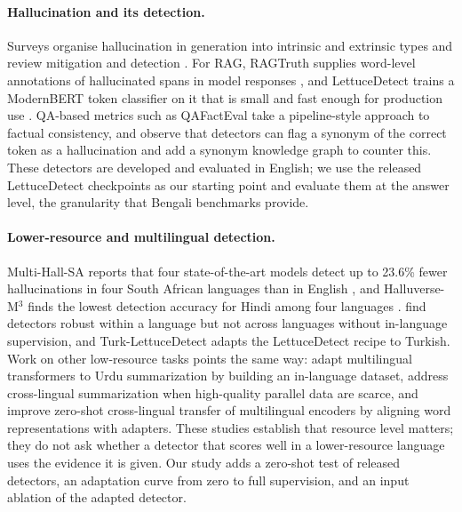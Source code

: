 \documentclass[manuscript,screen,review]{acmart}
\begin{document}
\paragraph{Hallucination and its detection.}
Surveys organise hallucination in generation into intrinsic and extrinsic types and review mitigation and detection \cite{ji2023survey,huang2025survey,maynez2020faithfulness}. For RAG, RAGTruth supplies word-level annotations of hallucinated spans in model responses \cite{niu2024ragtruth}, and LettuceDetect trains a ModernBERT \cite{warner2024modernbert} token classifier on it that is small and fast enough for production use \cite{kovacs2025lettucedetect}. QA-based metrics such as QAFactEval \cite{fabbri2022qafacteval} take a pipeline-style approach to factual consistency, and \citet{yang2026synonym} observe that detectors can flag a synonym of the correct token as a hallucination and add a synonym knowledge graph to counter this. These detectors are developed and evaluated in English; we use the released LettuceDetect checkpoints as our starting point and evaluate them at the answer level, the granularity that Bengali benchmarks provide.

\paragraph{Lower-resource and multilingual detection.}
Multi-Hall-SA reports that four state-of-the-art models detect up to 23.6\% fewer hallucinations in four South African languages than in English \cite{ralethe2026multihallsa}, and Halluverse-M$^3$ finds the lowest detection accuracy for Hindi among four languages \cite{abdaljalil2026halluverse}. \citet{datta2026lowresource} find detectors robust within a language but not across languages without in-language supervision, and Turk-LettuceDetect \cite{tas2025turk} adapts the LettuceDetect recipe to Turkish. Work on other low-resource tasks points the same way: \citet{munaf2024lowresource} adapt multilingual transformers to Urdu summarization by building an in-language dataset, \citet{lora2025conversum} address cross-lingual summarization when high-quality parallel data are scarce, and \citet{ahmat2023wadx} improve zero-shot cross-lingual transfer of multilingual encoders by aligning word representations with adapters. These studies establish that resource level matters; they do not ask whether a detector that scores well in a lower-resource language uses the evidence it is given. Our study adds a zero-shot test of released detectors, an adaptation curve from zero to full supervision, and an input ablation of the adapted detector.
\end{document}
